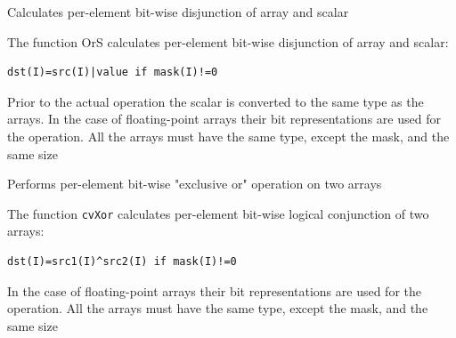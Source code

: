 \label{OrS}

Calculates per-element bit-wise disjunction of array and scalar


\begin{description}
\end{description}


The function OrS calculates per-element bit-wise disjunction of array and scalar:

\begin{lstlisting}
dst(I)=src(I)|value if mask(I)!=0
\end{lstlisting}

Prior to the actual operation the scalar is converted to the same type as the arrays. In the case of floating-point arrays their bit representations are used for the operation. All the arrays must have the same type, except the mask, and the same size


\label{Xor}

Performs per-element bit-wise "exclusive or" operation on two arrays


\begin{description}
\end{description}

The function \texttt{cvXor} calculates per-element bit-wise logical conjunction of two arrays:

\begin{lstlisting}
dst(I)=src1(I)^src2(I) if mask(I)!=0
\end{lstlisting}

In the case of floating-point arrays their bit representations are used for the operation. All the arrays must have the same type, except the mask, and the same size

